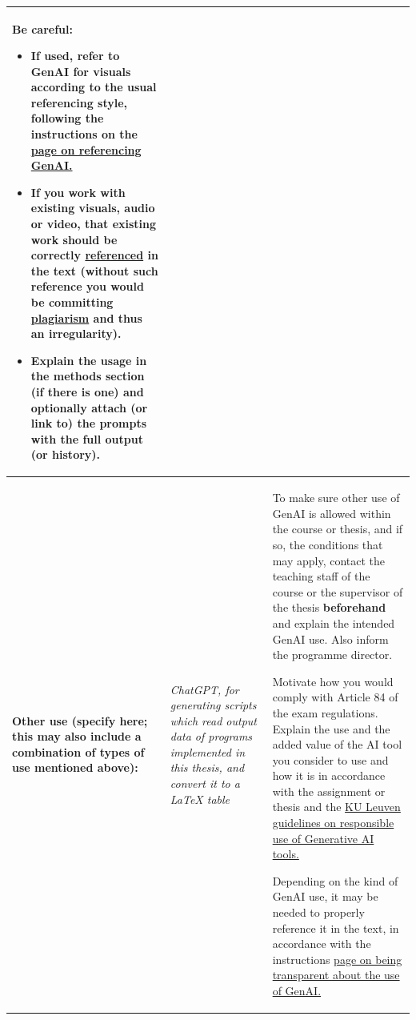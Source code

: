 \begin{longtable}{|p{}|p{}|p{}|}
\medskip
\textbf{Be careful:}
\begin{itemize}
    \item If used, refer to GenAI for visuals according to the usual referencing style, following the instructions on the \href{https://bib.kuleuven.be/english/training-and-tutorials/citation/refering-to-genai}{page on referencing GenAI.}
    \item If you work with existing visuals, audio or video, \textbf{that existing work should be correctly \href{https://bib.kuleuven.be/english/training-and-tutorials/citation}{referenced} in the text} (without such reference you would be committing \href{https://www.kuleuven.be/english/education/plagiarism/index}{plagiarism} and thus an irregularity).
    \item Explain the usage in the methods section (if there is one) and optionally attach (or link to) the prompts with the full output (or history).
\end{itemize} \\ \hline
\textbf{Other use (specify here; this may also include a combination of types of use mentioned above):} & \textit{ChatGPT, for generating scripts which read output data of programs implemented in this thesis, and convert it to a \LaTeX{} table} & To make sure other use of GenAI is allowed within the course or thesis, and if so, the conditions that may apply, contact the teaching staff of the course or the supervisor of the thesis \textbf{beforehand} and explain the intended GenAI use. Also inform the programme director. 

\medskip
Motivate how you would comply with Article 84 of the exam regulations. Explain the use and the added value of the AI tool you consider to use and how it is in accordance with the assignment or thesis and the \href{https://www.kuleuven.be/english/genai}{KU Leuven guidelines on responsible use of Generative AI tools.} 

\medskip
Depending on the kind of GenAI use, it may be needed to properly reference it in the text, in accordance with the instructions \href{https://www.kuleuven.be/english/education/student/educational-tools/generative-artificial-intelligence#Transparency}{page on being transparent about the use of GenAI.}\\ \hline
\end{longtable}